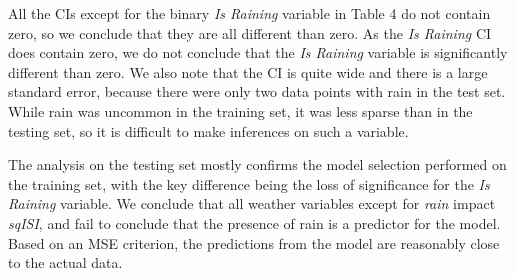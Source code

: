 \documentclass{article}
\begin{document}
\begin{table}[h!]
\begin{floatrow}
\end{floatrow}
\end{table}
All the CIs except for the binary \textit{Is Raining} variable in Table 4 do not contain zero, so we conclude that they are all different than zero. As the \textit{Is Raining} CI does contain zero, we do not conclude that the \textit{Is Raining} variable is significantly different than zero. We also note that the CI is quite wide and there is a large standard error, because there were only two data points with rain in the test set. While rain was uncommon in the training set, it was less sparse than in the testing set, so it is difficult to make inferences on such a variable. 

The analysis on the testing set mostly confirms the model selection performed on the training set, with the key difference being the loss of significance for the \textit{Is Raining} variable.  We conclude that all weather variables except for \textit{rain} impact \textit{sqISI}, and fail to conclude that the presence of rain is a predictor for the model. Based on an MSE criterion, the predictions from the model are reasonably close to the actual data.
\end{document}
